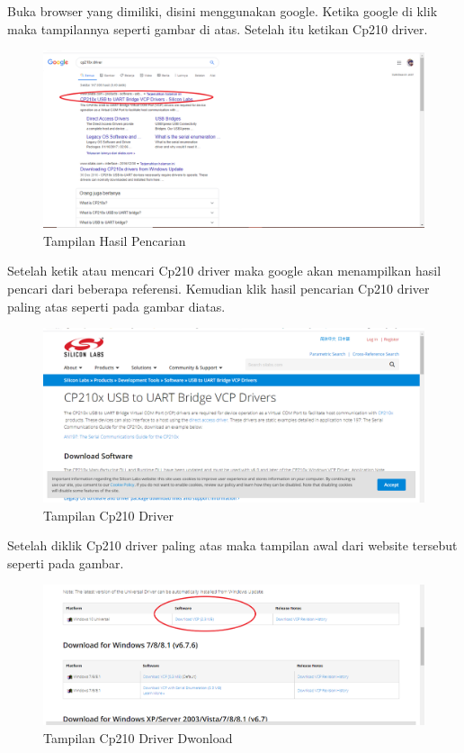 \par Buka browser yang dimiliki, disini menggunakan google. Ketika google di klik maka tampilannya seperti gambar di atas. Setelah itu ketikan Cp210 driver.
\begin{figure}[H]
\centering
\includegraphics[width=1\textwidth]{figures/google2.png}
\caption{Tampilan Hasil Pencarian }
\label{print}
\end{figure}
\par Setelah ketik atau mencari Cp210 driver maka google akan menampilkan hasil pencari dari beberapa referensi. Kemudian klik hasil pencarian Cp210 driver paling atas seperti pada gambar diatas.
\begin{figure}[H]
\centering
\includegraphics[width=1\textwidth]{figures/google3.png}
\caption{Tampilan Cp210 Driver }
\label{print}
\end{figure}
\par Setelah diklik Cp210 driver paling atas maka tampilan awal dari website tersebut seperti pada gambar.
\begin{figure}[H]
\centering
\includegraphics[width=1\textwidth]{figures/google4.png}
\caption{Tampilan Cp210 Driver Dwonload }
\label{print}
\end{figure}
